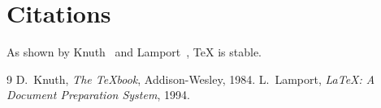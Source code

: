 \documentclass{article}
\begin{document}
\section{Citations}
As shown by Knuth~\cite{knuth} and Lamport~\cite{lamport}, TeX is stable.

\begin{thebibliography}{9}
 D.~Knuth, \emph{The TeXbook}, Addison-Wesley, 1984.
 L.~Lamport, \emph{LaTeX: A Document Preparation System}, 1994.
\end{thebibliography}
\end{document}
